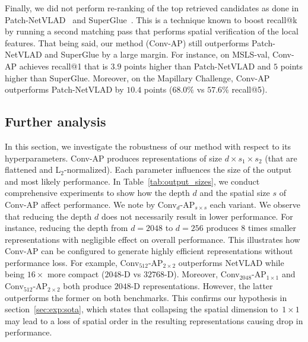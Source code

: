 \documentclass{article}
\begin{document}
Finally, we did not perform re-ranking of the top retrieved candidates as done in Patch-NetVLAD~\cite{hausler2021patch} and SuperGlue~\cite{sarlin2020superglue}. This is a technique known to boost recall@k by running a second matching pass that performs spatial verification of the local features. That being said, our method (Conv-AP) still outperforms Patch-NetVLAD and SuperGlue by a large margin. For instance, on MSLS-val, Conv-AP achieves recall@1 that is $3.9$ points higher than Patch-NetVLAD and $5$ points higher than SuperGlue. Moreover, on the Mapillary Challenge, Conv-AP outperforms Patch-NetVLAD by $10.4$ points ($68.0\%$ vs $57.6\%$ recall@5).



\subsection{Further analysis}\label{sec:exp:extended}
In this section, we investigate the robustness of our method with respect to its hyperparameters. Conv-AP produces representations of size $d {\times} s_1 {\times} s_2$ (that are flattened and L$_2$-normalized). Each parameter influences the size of the output and most likely performance. In Table~\ref{tab:output_sizes}, we conduct comprehensive experiments to show how the depth $d$ and the spatial size $s$ of Conv-AP affect performance. We note by Conv$_{d}$-AP$_{s {\times} s}$ each variant. 
We observe that reducing the depth $d$ does not necessarily result in lower performance. For instance, reducing the depth from $d=2048$ to $d=256$ produces $8$ times smaller representations with negligible effect on overall performance. This illustrates how Conv-AP can be configured to generate highly efficient representations without performance loss. For example, \mbox{Conv$_{512}$-AP$_{2 {\times} 2}$} outperforms NetVLAD while being $16\times$ more compact ($2048$-D vs $32768$-D). 
Moreover, \mbox{Conv$_{2048}$-AP$_{1{\times}1}$} and Conv$_{512}$-AP$_{2 \times 2}$ both produce $2048$-D representations. However, the latter outperforms the former on both benchmarks. This confirms our hypothesis in section~\ref{sec:exp:sota}, which states that collapsing the spatial dimension to~$1{\times}1$ may lead to a loss of spatial order in the resulting representations causing drop in performance.
\end{document}
